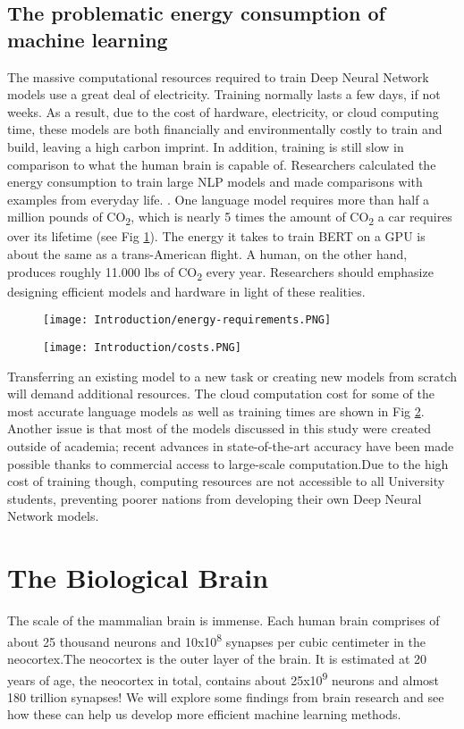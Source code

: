 \documentclass[12pt]{report}
\begin{document}
\section{The problematic energy consumption of machine learning}
The massive computational resources required to train Deep Neural Network models use a great deal of electricity. Training normally lasts a few days, if not weeks. As a result, due to the cost of hardware, electricity, or cloud computing time, these models are both financially and environmentally costly to train and build, leaving a high carbon imprint. In addition, training is still slow in comparison to what the human brain is capable of. Researchers calculated the energy consumption to train large NLP models and made comparisons with examples from everyday life. \cite{Strubell2019}. One language model requires more than half a million pounds of CO\textsubscript{2}, which is nearly 5 times the amount of CO\textsubscript{2} a car requires over its lifetime (see Fig \ref{fig:energy-requirements}). The energy it takes to train BERT on a GPU is about the same as a trans-American flight. A human, on the other hand, produces roughly 11.000 lbs of CO\textsubscript{2} every year. Researchers should emphasize designing efficient models and hardware in light of these realities.

\begin{figure}[htp]
    \centering
    \texttt{[image: Introduction/energy-requirements.PNG]}
    \caption{}
    \label{fig:energy-requirements}
\end{figure}
\begin{figure}[htp]
    \centering
    \texttt{[image: Introduction/costs.PNG]}
    \caption{}
    \label{fig:costs}
\end{figure}

Transferring an existing model to a new task or creating new models from scratch will demand additional resources. The cloud computation cost for some of the most accurate language models as well as training times are shown in Fig \ref{fig:costs}. Another issue is that most of the models discussed in this study \cite{Strubell2019} were created outside of academia; recent advances in state-of-the-art accuracy have been made possible thanks to commercial access to large-scale computation.Due to the high cost of training though, computing resources are not accessible to all University students, preventing poorer nations from developing their own Deep Neural Network models.

\chapter{The Biological Brain}
The scale of the mammalian brain is immense. Each human brain comprises of about 25 thousand neurons and  10x10\textsuperscript{8} synapses per cubic centimeter \cite{nguyen2013} in the neocortex.The neocortex is the outer layer of the brain. It is estimated at 20 years of age, the neocortex in total, contains about 25x10\textsuperscript{9} neurons and almost 180 trillion synapses! We will explore some findings from brain research and see how these can help us develop more efficient machine learning methods.
\end{document}
